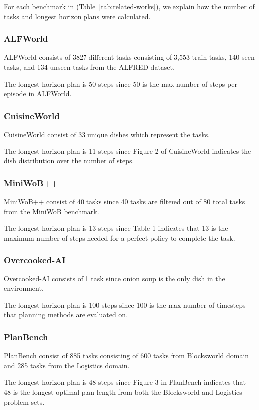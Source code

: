 For each benchmark in (Table~\ref{tab:related-works}), we explain how the number of tasks and longest horizon plans were calculated.
\subsubsection{ALFWorld}
ALFWorld consists of 3827 different tasks consisting of 3,553 train tasks, 140 seen tasks, and 134 unseen tasks from the ALFRED dataset.

The longest horizon plan is 50 steps since 50 is the max number of steps per episode in ALFWorld.

\subsubsection{CuisineWorld}
CuisineWorld consist of 33 unique dishes which represent the tasks.

The longest horizon plan is 11 steps since Figure 2 of CuisineWorld indicates the dish distribution over the number of steps.

\subsubsection{MiniWoB++}
MiniWoB++ consist of 40 tasks since 40 tasks are filtered out of 80 total tasks from the MiniWoB benchmark.

The longest horizon plan is 13 steps since Table 1 indicates that 13 is the maximum number of steps needed for a perfect policy to complete the task.

\subsubsection{Overcooked-AI}
Overcooked-AI consists of 1 task since onion soup is the only dish in the environment.

The longest horizon plan is 100 steps since 100 is the max number of timesteps that planning methods are evaluated on.

\subsubsection{PlanBench}
PlanBench consist of 885 tasks consisting of 600 tasks from Blocksworld domain and 285 tasks from the Logistics domain.

The longest horizon plan is 48 steps since Figure 3 in PlanBench indicates that 48 is the longest optimal plan length from both the Blocksworld and Logistics problem sets.

